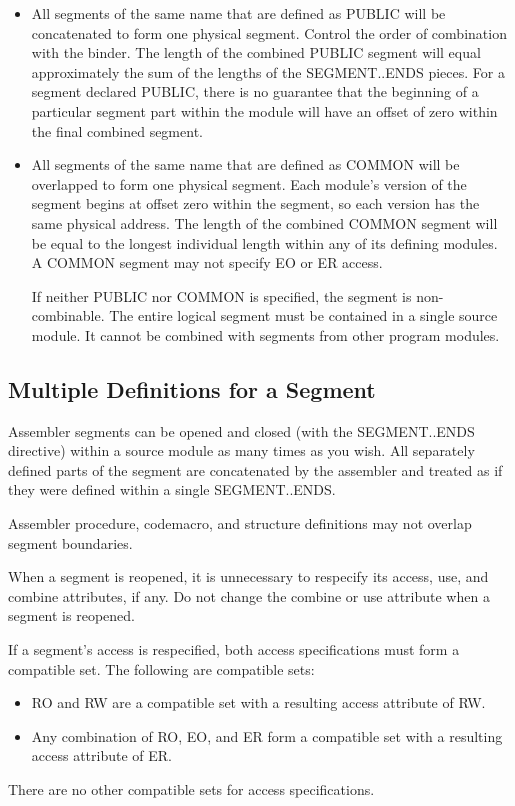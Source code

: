 \begin{itemize}
\item All segments of the same name that are defined as PUBLIC will be concatenated to form one physical segment. Control the order of combination with the binder.
The length of the combined PUBLIC segment will equal approximately the sum of the lengths of the SEGMENT..ENDS pieces. For a segment declared PUBLIC, there is no guarantee that the beginning of a particular segment part within the module will have an offset of zero within the final combined segment.

\item All segments of the same name that are defined as COMMON will be overlapped to form one physical segment. Each module's version of the segment begins at offset zero within the segment, so each version has the same physical address.
The length of the combined COMMON segment will be equal to the longest individual length within any of its defining modules. A COMMON segment may not specify EO or ER access.

If neither PUBLIC nor COMMON is specified, the segment is non-combinable. The entire logical segment must be contained in a single source module. It cannot be combined with segments from other program modules.
\end{itemize}

\subsection*{Multiple Definitions for a Segment}

Assembler segments can be opened and closed (with the SEGMENT..ENDS directive) within a source module as many times as you wish. All separately defined parts of the segment are concatenated by the assembler and treated as if they were defined within a single SEGMENT..ENDS.

Assembler procedure, codemacro, and structure definitions may not overlap segment boundaries.

When a segment is reopened, it is unnecessary to respecify its access, use, and combine attributes, if any. Do not change the combine or use attribute when a segment is reopened.

If a segment's access is respecified, both access specifications must form a compatible set. The following are compatible sets:
\begin{itemize}
\item RO and RW are a compatible set with a resulting access attribute of RW.
\item Any combination of RO, EO, and ER form a compatible set with a resulting access attribute of ER.
\end{itemize}
There are no other compatible sets for access specifications.
